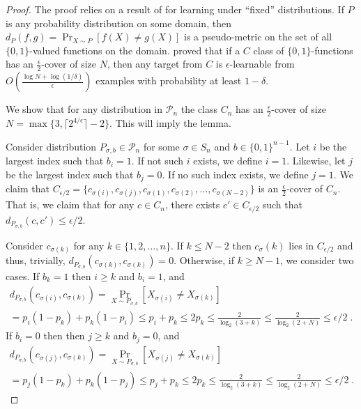 \documentclass[12pt]{article}
\renewcommand{\P}{\mathcal{P}}
\begin{document}
\begin{proof}
The proof relies on a result of \cite{Benedek-Itai-1991} for learning under
``fixed'' distributions. If $P$ is any probability distribution on some domain,
then $d_P(f,g) = \Pr_{X \sim P}[f(X) \neq g(X)]$ is a pseudo-metric on the set of all
$\{0,1\}$-valued functions on the domain. \cite{Benedek-Itai-1991} proved that
if a $C$ class of $\{0,1\}$-functions has an $\frac{\epsilon}{2}$-cover of size
$N$, then any target from $C$ is $\epsilon$-learnable from $O
\left( \frac{\log N + \log (1/\delta)}{\epsilon}\right)$ examples
with probability at least $1-\delta$.

We show that for any distribution in $\P_n$ the class $C_n$ has an $\frac{\epsilon}{2}$-cover of size
$N = \max\{3, \lceil 2^{4/\epsilon}\rceil  - 2 \}$. This will imply the lemma.

Consider distribution $P_{\sigma,b} \in \P_n$ for some $\sigma \in S_n$ and $b
\in \{0,1\}^{n-1}$. Let $i$ be the largest index such that $b_i = 1$.
If not such $i$ exists, we define $i=1$. Likewise, let $j$ be the largest
index such that $b_j = 0$. If no such index exists, we define $j=1$.
We claim that $C_{\epsilon/2} = \{ c_{\sigma(i)}, c_{\sigma(j)}, c_{\sigma(1)},
c_{\sigma(2)}, \dots, c_{\sigma(N-2)}\}$ is an $\frac{\epsilon}{2}$-cover of
$C_n$. That is, we claim that for any $c \in C_n$, there exists $c' \in
C_{\epsilon/2}$ such that $d_{P_{\sigma,b}}(c,c') \le \epsilon/2$.

Consider $c_{\sigma(k)}$ for any $k \in \{1,2,\dots,n\}$. If $k \le N - 2$
then $c_\sigma(k)$ lies in $C_{\epsilon/2}$ and thus, trivially, $d_{P_{\sigma,b}}(c_{\sigma(k)},c_{\sigma(k)}) = 0$.
Otherwise, if  $k \ge N - 1$, we consider two cases. If $b_k = 1$ then $i \ge k$ and $b_i = 1$, and
\begin{multline*}
d_{P_{\sigma,b}}(c_{\sigma(i)}, c_{\sigma(k)})
= \Pr_{X \sim P_{\sigma,b}}[X_{\sigma(i)} \neq X_{\sigma(k)} ] \\
= p_i (1 - p_k) + p_k (1 - p_i)
\le p_i + p_k
\le 2 p_k
\le \frac{2}{\log_2(3 + k)}
\le \frac{2}{\log_2(2 + N)}
\le \epsilon/2 \; .
\end{multline*}
If $b_i = 0$ then then $j \ge k$ and $b_j = 0$, and
\begin{multline*}
d_{P_{\sigma,b}}(c_{\sigma(j)}, c_{\sigma(k)})
= \Pr_{X \sim P_{\sigma,b}}[X_{\sigma(j)} \neq X_{\sigma(k)} ] \\
= p_j (1 - p_k) + p_k (1 - p_j)
\le p_j + p_k
\le 2 p_k
\le \frac{2}{\log_2(3 + k)}
\le \frac{2}{\log_2(2 + N)}
\le \epsilon/2 \; .
\end{multline*}
\end{proof}
\end{document}
